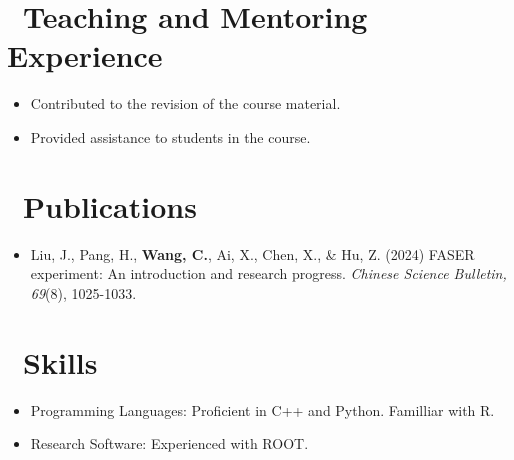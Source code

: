 \documentclass{resume}
\begin{document}

\section{\faUsers\ Teaching and Mentoring Experience}
\begin {itemize}
  \item Contributed to the revision of the course material.
  \item Provided assistance to students in the course.
\end{itemize}


\section{\faBook\ Publications}
\begin{itemize}
  \item Liu, J., Pang, H., \textbf{Wang, C.}, Ai, X., Chen, X., \& Hu, Z. (2024) FASER experiment: An introduction and research progress. \textit{Chinese Science Bulletin, 69}(8), 1025-1033.
\end{itemize}


\section{\faCogs\ Skills}
\begin{itemize}[parsep=0.5ex]
  \item Programming Languages: Proficient in C++ and Python. Familliar with R.
  \item Research Software: Experienced with ROOT.
\end{itemize}


%
%
\end{document}
